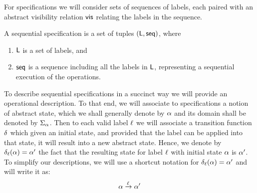 
For specifications we will consider sets of sequences of labels, each
paired with an abstract visibility relation $\mathsf{vis}$ relating the
labels in the sequence.


\begin{definition}
  \label{definition:sequential specification} A sequential
  specification is a set of tuples $(\mathsf{L}, \mathsf{seq})$, where
  \begin{enumerate}
  \item $\mathsf{L}$ is a set of labels, and
  \item $\mathsf{seq}$ is a sequence including all the labels in $\mathsf{L}$,
    representing a sequential execution of the operations.
  \end{enumerate}
\end{definition}

To describe sequential specifications in a succinct way we will
provide an operational description.
To that end, we will associate to specifications a notion of abstract
state, which we shall generally denote by $\alpha$ and its domain
shall be denoted by $\Sigma_{\alpha}$.
Then to each valid label $\ell$ we will associate a transition
function $\delta$ which given an initial state, and provided
that the label can be applied into that state, it will result into a
new abstract state.
Hence, we denote by $\delta_{\ell}(\alpha) = \alpha'$ the fact that
the resulting state for label $\ell$ with initial state $\alpha$
is $\alpha'$.
%
To simplify our descriptions, we will use a shortcut notation for
$\delta_{\ell}(\alpha) = \alpha'$ and will write it as:
\[ \alpha \xrightarrow{\ell}  \alpha' \]

